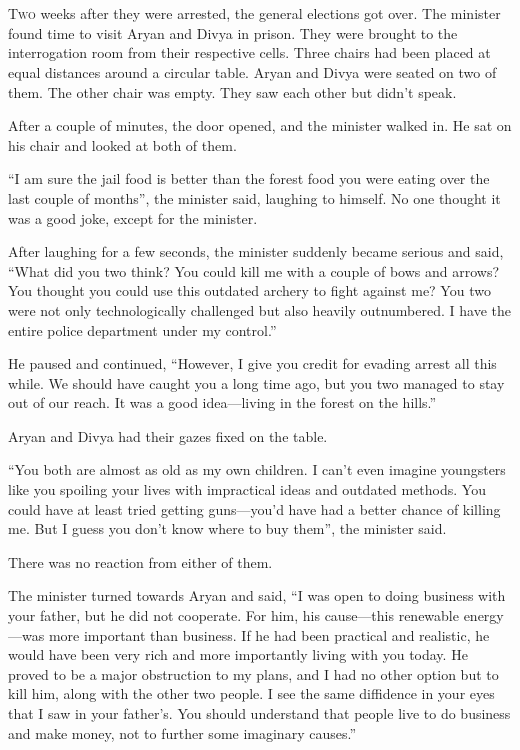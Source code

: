 \chapter{}

\lettrine{T}{wo} weeks after they were arrested, the general elections got over.
The minister found time to visit Aryan and Divya in prison. They were brought to
the interrogation room from their respective cells. Three chairs had been placed
at equal distances around a circular table. Aryan and Divya were seated on two
of them. The other chair was empty. They saw each other but didn't speak.

After a couple of minutes, the door opened, and the minister walked in. He sat
on his chair and looked at both of them.

“I am sure the jail food is better than the forest food you were eating over the
last couple of months”, the minister said, laughing to himself. No one thought
it was a good joke, except for the minister.

After laughing for a few seconds, the minister suddenly became serious and said,
“What did you two think? You could kill me with a couple of bows and arrows? You
thought you could use this outdated archery to fight against me? You two were
not only technologically challenged but also heavily outnumbered. I
have the entire police department under my control.”

He paused and continued, “However, I give you credit for evading arrest all this
while. We should have caught you a long time ago, but you two managed to stay
out of our reach. It was a good idea—living in the forest on the
hills.”

Aryan and Divya had their gazes fixed on the table.

“You both are almost as old as my own children. I can't even imagine youngsters
like you spoiling your lives with impractical ideas and outdated methods. You
could have at least tried getting guns—you'd have had a better chance of killing
me. But I guess you don't know where to buy them”, the minister said.

There was no reaction from either of them.

The minister turned towards Aryan and said, “I was open to doing business with your
father, but he did not cooperate. For him, his cause—this renewable energy—was
more important than business. If he had been practical and realistic, he would
have been very rich and more importantly living with you today. He proved to be a major
obstruction to my plans, and I had no other option but to kill him, along with
the other two people. I see the same diffidence in your eyes that I saw in your
father's. You should understand that people live to do business and make money,
not to further some imaginary causes.”

